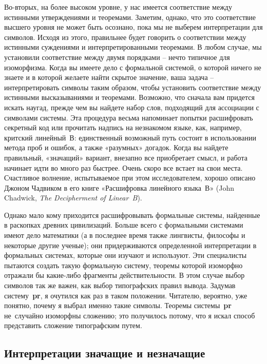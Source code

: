 \documentclass[../main.tex]{subfiles}
\begin{document}
Во-вторых, на более высоком уровне, у нас имеется соответствие между истинными утверждениями и теоремами. Заметим, однако, что это соответствие высшего уровня не может быть осознано, пока мы не выберем интерпретации для символов. Исходя из этого, правильнее будет говорить о соответствии между истинными суждениями и интерпретированными теоремами. В любом случае, мы установили соответствие между двумя порядками \--- нечто типичное для изоморфизма. Когда вы имеете дело с формальной системой, о которой ничего не знаете и в которой желаете найти скрытое значение, ваша задача \--- интерпретировать символы таким образом, чтобы установить соответствие между истинными высказываниями и теоремами. Возможно, что сначала вам придется искать наугад, прежде чем вы найдете набор слов, подходящий для ассоциации с символами системы. Эта процедура весьма напоминает попытки расшифровать секретный код или прочитать надпись на незнакомом языке, как, например, критский линейный~В: единственный возможный путь состоит в использовании метода проб и ошибок, а также «разумных» догадок. Когда вы найдете правильный, «значащий» вариант, внезапно все приобретает смысл, и работа начинает идти во много раз быстрее. Очень скоро все встает на свои места. Счастливое волнение, испытываемое при этом исследователем, хорошо описано Джоном Чадвиком в его книге «Расшифровка линейного языка~В» (John Chadwick, \textit{The Decipherment of Linear~B}).

Однако мало кому приходится расшифровывать формальные системы, найденные в раскопках древних цивилизаций. Больше всего с формальными системами имеют дело математики (а в последнее время также лингвисты, философы и некоторые другие ученые); они придерживаются определенной интерпретации в формальных системах, которые они изучают и используют. Эти специалисты пытаются создать такую формальную систему, теоремы которой изоморфно отражали бы какие-либо фрагменты действительности. В этом случае выбор символов так же важен, как выбор типографских правил вывода. Задумав систему~\textbf{pr}, я очутился как раз в таком положении. Читателю, вероятно, уже понятно, почему я выбрал именно такие символы. Теоремы системы~\textbf{pr} не~случайно изоморфны сложению; это получилось потому, что я искал способ представить сложение типографским путем.


\subsection{Интерпретации значащие и незначащие}
\end{document}
